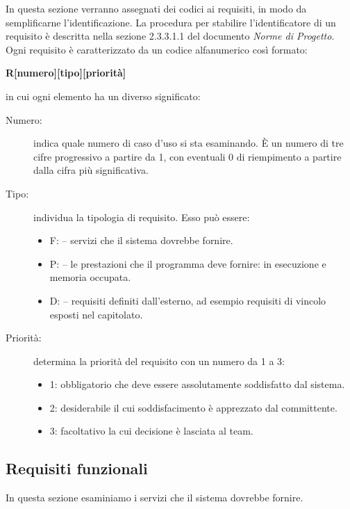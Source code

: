 \documentclass[../analisi-dei-requisiti]{subfiles}
\begin{document}
In questa sezione verranno assegnati dei codici ai requisiti, in modo da semplificarne l’identificazione.
La procedura per stabilire l'identificatore di un requisito è descritta nella sezione 2.3.3.1.1 del documento \textit{Norme di Progetto}.
Ogni requisito è caratterizzato da un codice alfanumerico così formato:
\begin{center}
  \textbf{R[numero][tipo][priorità]}
\end{center}
in cui ogni elemento ha un diverso significato:
\begin{description}
  \item[Numero:] indica quale numero di caso d'uso si sta esaminando. È un numero di tre cifre progressivo a partire da 1, con eventuali 0 di riempimento a partire dalla cifra più significativa.
  \item[Tipo:] individua la tipologia di requisito. Esso può essere:
        \begin{itemize}
          \item F: \@funzionale -- \@indica servizi che il sistema dovrebbe fornire.
          \item P: \@prestazionale -- \@indica le prestazioni che il programma deve fornire:  in esecuzione e memoria occupata.
          \item D: \@dichiarativo -- \@indica requisiti definiti dall'esterno, ad esempio requisiti di vincolo esposti nel capitolato.
        \end{itemize}
  \item[Priorità:] determina la priorità del requisito con un numero da 1 a 3:
        \begin{itemize}
          \item 1: \@requisito obbligatorio che deve essere assolutamente soddisfatto dal sistema.
          \item 2: \@requisito desiderabile il cui soddisfacimento è apprezzato dal committente.
          \item 3: \@requisito facoltativo la cui decisione è lasciata al team.
        \end{itemize}
\end{description}


\subsection{Requisiti funzionali}%
\label{sub:requisiti_funzionali}
In questa sezione esaminiamo i servizi che il sistema dovrebbe fornire.
\end{document}
